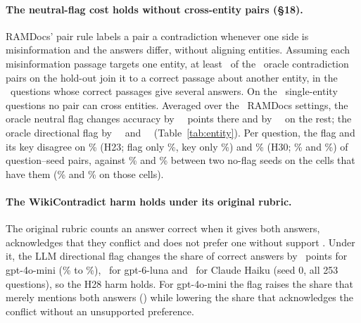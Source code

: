 \paragraph{The neutral-flag cost holds without cross-entity pairs (\S18).} RAMDocs' pair rule labels a pair a
contradiction whenever one side is misinformation and the answers differ, without aligning entities. Assuming each
misinformation passage targets one entity, at least \pairCrossLb\ of the \pairContraN\ oracle contradiction pairs on the
hold-out join it to a correct passage about another entity, in the \pairMultiN\ questions whose correct passages give
several answers. On the \pairSingleN\ single-entity questions no pair can cross entities. Averaged over the \entNeuK\
RAMDocs settings, the oracle neutral flag changes accuracy by \entNeuSingle\ \entNeuSingleCI\ points there and by
\entNeuMulti\ \entNeuMultiCI\ on the rest; the oracle directional flag by \entDirSingle\ \entDirSingleCI\ and
\entDirMulti\ \entDirMultiCI\ (Table~\ref{tab:entity}). Per question, the flag and its key disagree on \agrTwentyThreeDis\% (H23; flag only \agrTwentyThreeFlagOnly\%,
key only \agrTwentyThreeKeyOnly\%) and \agrThirtyDis\% (H30; \agrThirtyFlagOnly\% and \agrThirtyKeyOnly\%) of
question--seed pairs, against \agrTwentyThreeNull\% and \agrThirtyNull\% between two no-flag seeds on the cells that have
them (\agrTwentyThreeDisMatched\% and \agrThirtyDisMatched\% on those cells).

\paragraph{The WikiContradict harm holds under its original rubric.} The original rubric counts an answer correct when it gives
both answers, acknowledges that they conflict and does not prefer one without support
\citep[\S3.4]{hou2024wikicontradict}. Under it, the LLM directional flag changes the share of correct answers
by \wikiOrigMiniEff\ points for gpt-4o-mini (\wikiOrigMiniPlain\% to \wikiOrigMiniDir\%), \wikiOrigLunaEff\ for
gpt-6-luna and \wikiOrigHaikuEff\ for Claude Haiku (seed 0, all 253 questions), so the H28 harm holds. For gpt-4o-mini the flag raises the share that merely mentions both answers (\wikiBothMiniEff) while
lowering the share that acknowledges the conflict without an unsupported preference.

